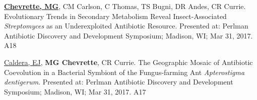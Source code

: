 \begin{cvpubs}

  \cvpub
    {\underline{\textbf{Chevrette, MG}}, CM Carlson, C Thomas, TS Bugni, DR Andes, CR Currie.  Evolutionary Trends in Secondary Metabolism Reveal Insect-Associated \textit{Streptomyces} as an Underexploited Antibiotic Resource.  Presented at: Perlman Antibiotic Discovery and Development Symposium; Madison, WI; Mar 31, 2017.} %
    {A18} %

  \cvpub
    {\underline{Caldera, EJ}, \textbf{MG Chevrette}, CR Currie.  The Geographic Mosaic of Antibiotic Coevolution in a Bacterial Symbiont of the Fungus-farming Ant \textit{Apterostigma dentigerum}.  Presented at: Perlman Antibiotic Discovery and Development Symposium; Madison, WI; Mar 31, 2017.} %
    {A17} %

\end{cvpubs}
